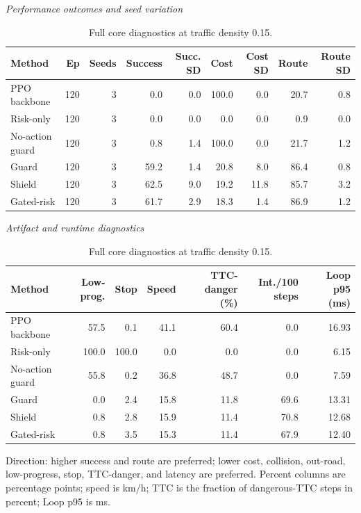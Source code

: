 \begin{table}[!htbp]
\centering
\caption{Full core diagnostics at traffic density 0.15.}
\label{tab_core}
\scriptsize
\setlength{\tabcolsep}{3.2pt}
\renewcommand{\arraystretch}{1.08}
\textit{Performance outcomes and seed variation}\par
\begin{tabular}{@{}lrrrrrrrr@{}}
\toprule
Method & Ep & Seeds & Success & Succ. SD & Cost & Cost SD & Route & Route SD \\
\midrule
PPO backbone & 120 & 3 & 0.0 & 0.0 & 100.0 & 0.0 & 20.7 & 0.8 \\
Risk-only & 120 & 3 & 0.0 & 0.0 & 0.0 & 0.0 & 0.9 & 0.0 \\
No-action guard & 120 & 3 & 0.8 & 1.4 & 100.0 & 0.0 & 21.7 & 1.2 \\
Guard & 120 & 3 & 59.2 & 1.4 & 20.8 & 8.0 & 86.4 & 0.8 \\
Shield & 120 & 3 & 62.5 & 9.0 & 19.2 & 11.8 & 85.7 & 3.2 \\
Gated-risk & 120 & 3 & 61.7 & 2.9 & 18.3 & 1.4 & 86.9 & 1.2 \\
\bottomrule
\end{tabular}
\vspace{3pt}
\textit{Artifact and runtime diagnostics}\par
\begin{tabular}{@{}lrrrrrr@{}}
\toprule
Method & Low-prog. & Stop & Speed & TTC-danger (\%) & Int./100 steps & Loop p95 (ms) \\
\midrule
PPO backbone & 57.5 & 0.1 & 41.1 & 60.4 & 0.0 & 16.93 \\
Risk-only & 100.0 & 100.0 & 0.0 & 0.0 & 0.0 & 6.15 \\
No-action guard & 55.8 & 0.2 & 36.8 & 48.7 & 0.0 & 7.59 \\
Guard & 0.0 & 2.4 & 15.8 & 11.8 & 69.6 & 13.31 \\
Shield & 0.8 & 2.8 & 15.9 & 11.4 & 70.8 & 12.68 \\
Gated-risk & 0.8 & 3.5 & 15.3 & 11.4 & 67.9 & 12.40 \\
\bottomrule
\end{tabular}
\begin{tablenotes}
\item Direction: higher success and route are preferred; lower cost, collision, out-road, low-progress, stop, TTC-danger, and latency are preferred. Percent columns are percentage points; speed is km/h; TTC is the fraction of dangerous-TTC steps in percent; Loop p95 is ms.
\end{tablenotes}
\end{table}
